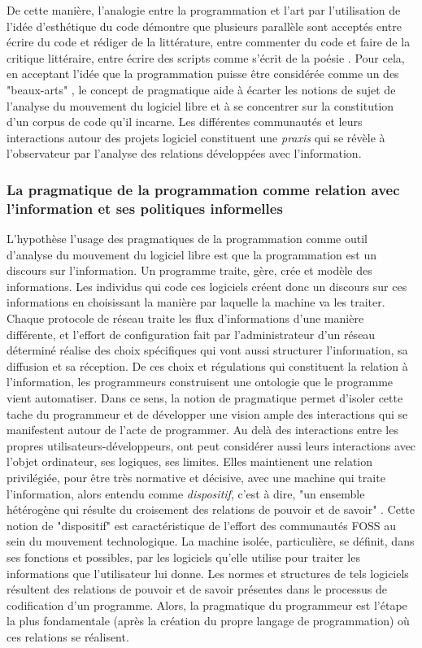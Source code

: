 De cette manière, l'analogie entre la programmation et l'art par l'utilisation de l'idée d'esthétique du code \citep{Chopra+Dexter2007} démontre que plusieurs parallèle sont acceptés entre écrire du code et rédiger de la littérature, entre commenter du code et faire de la critique littéraire, entre écrire des scripts comme s'écrit de la poésie \citep{Black2002}. Pour cela, en acceptant l'idée que la programmation puisse être considérée comme un des "beaux-arts" \citep{Levy1992}, le concept de pragmatique aide à écarter les notions de sujet de l'analyse du mouvement du logiciel libre et à se concentrer sur la constitution d'un corpus de code qu'il incarne. Les différentes communautés et leurs interactions autour des projets logiciel constituent une \emph{praxis} qui se révèle à l'observateur par l'analyse des relations développées avec l'information.

\subsubsection{La pragmatique de la programmation comme relation avec l'information et ses politiques informelles} \label{2.3.2.b}

L'hypothèse l'usage des pragmatiques de la programmation comme outil d'analyse du mouvement du logiciel libre est que la programmation est un discours sur l'information. Un programme traite, gère, crée et modèle des informations. Les individus qui code ces logiciels créent donc un discours sur ces informations en choisissant la manière par laquelle la machine va les traiter. Chaque protocole de réseau traite les flux d'informations d'une manière différente, et l'effort de configuration fait par l'administrateur d'un réseau déterminé réalise des choix spécifiques qui vont aussi structurer l'information, sa diffusion et sa réception. De ces choix et régulations qui constituent la relation à l'information, les programmeurs construisent une ontologie que le programme vient automatiser. Dans ce sens, la notion de pragmatique permet d'isoler cette tache du programmeur et de développer une vision ample des interactions qui se manifestent autour de l'acte de programmer. Au delà des interactions entre les propres utilisateurs-développeurs, ont peut considérer aussi leurs interactions avec l'objet ordinateur, ses logiques, ses limites. Elles maintienent une relation privilégiée, pour être très normative et décisive, avec une machine qui traite l'information, alors entendu comme \emph{dispositif}, c'est à dire, "un ensemble hétérogène qui résulte du croisement des relations de pouvoir et de savoir" \citep{Agamben2007}. Cette notion de "dispositif" est caractéristique de l'effort des communautés FOSS au sein du mouvement technologique. La machine isolée, particulière, se définit, dans ses fonctions et possibles, par les logiciels qu'elle utilise pour traiter les informations que l'utilisateur lui donne. Les normes et structures de tels logiciels résultent des relations de pouvoir et de savoir présentes dans le processus de codification d'un programme. Alors, la pragmatique du programmeur est l'étape la plus fondamentale (après la création du propre langage de programmation) où ces relations se réalisent.


